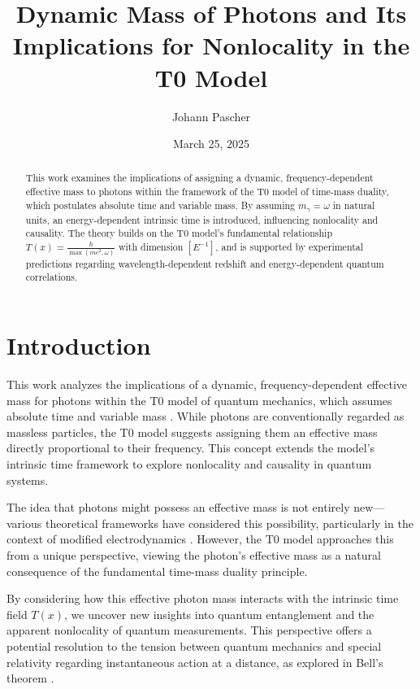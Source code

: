 \documentclass[12pt,a4paper]{article}
\title{Dynamic Mass of Photons and Its Implications for Nonlocality in the T0 Model}
\author{Johann Pascher}
\date{March 25, 2025}
\newcommand{\Tfield}{T(x)}
\begin{document}
	
	\maketitle
	
	\begin{abstract}
		This work examines the implications of assigning a dynamic, frequency-dependent effective mass to photons within the framework of the T0 model of time-mass duality, which postulates absolute time and variable mass. By assuming \(m_\gamma = \omega\) in natural units, an energy-dependent intrinsic time is introduced, influencing nonlocality and causality. The theory builds on the T0 model's fundamental relationship \(\Tfield = \frac{\hbar}{\max(m c^2, \omega)}\) with dimension \([E^{-1}]\), and is supported by experimental predictions regarding wavelength-dependent redshift and energy-dependent quantum correlations.
	\end{abstract}
	
	\tableofcontents
	\newpage
	
	\section{Introduction}
	This work analyzes the implications of a dynamic, frequency-dependent effective mass for photons within the T0 model of quantum mechanics, which assumes absolute time and variable mass \cite{pascher_zeit_masse_2025, pascher_zeit_2025}. While photons are conventionally regarded as massless particles, the T0 model suggests assigning them an effective mass directly proportional to their frequency. This concept extends the model's intrinsic time framework to explore nonlocality and causality in quantum systems.
	
	The idea that photons might possess an effective mass is not entirely new—various theoretical frameworks have considered this possibility, particularly in the context of modified electrodynamics \cite{de_broglie1940, proca1936}. However, the T0 model approaches this from a unique perspective, viewing the photon's effective mass as a natural consequence of the fundamental time-mass duality principle.
	
	By considering how this effective photon mass interacts with the intrinsic time field \(\Tfield\), we uncover new insights into quantum entanglement and the apparent nonlocality of quantum measurements. This perspective offers a potential resolution to the tension between quantum mechanics and special relativity regarding instantaneous action at a distance, as explored in Bell's theorem \cite{bell}.
	
\end{document}
